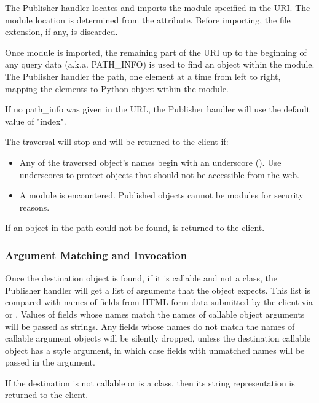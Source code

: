 The Publisher handler locates and imports the module specified in the
URI. The module location is determined from the
 attribute. Before importing, the file extension, 
if any, is discarded.

Once module is imported, the remaining part of the URI up to the
beginning of any query data (a.k.a. PATH_INFO) is used to find an
object within the module. The Publisher handler  the 
path, one element at a time from left to right, mapping the elements
to Python object within the module.

If no path_info was given in the URL, the Publisher handler will use
the default value of "index".

The traversal will stop and  will be returned to
the client if:

\begin{itemize}

\item
Any of the traversed object's names begin with an underscore
(\samp{\_}). Use underscores to protect objects that should not be
accessible from the web.

\item
A module is encountered. Published objects cannot be modules for
security reasons.

\end{itemize}

If an object in the path could not be found, 
is returned to the client.

\subsubsection{Argument Matching and Invocation\label{hand-pub-alg-args}}

Once the destination object is found, if it is callable and not a
class, the Publisher handler will get a list of arguments that the
object expects. This list is compared with names of fields from HTML
form data submitted by the client via  or
. Values of fields whose names match the names of callable
object arguments will be passed as strings. Any fields whose names do
not match the names of callable argument objects will be silently dropped,
unless the destination callable object has a  style
argument, in which case fields with unmatched names will be passed in the
 argument.

If the destination is not callable or is a class, then its string
representation is returned to the client.

